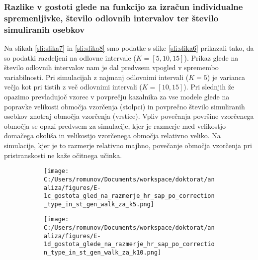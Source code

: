 \subsubsection[\bfseries Razlike v gostoti glede na funkcijo za izračun individualne spremenljivke, število odlovnih intervalov ter število simuliranih osebkov]{Razlike v gostoti glede na funkcijo za izračun individualne spremenljivke, število odlovnih intervalov ter število simuliranih osebkov}
Na slikah \ref{sli:slika7} in \ref{sli:slika8} smo podatke s slike \ref{sli:slika6} prikazali tako, da so podatki razdeljeni na odlovne intervale ($K = [5, 10, 15]$). Prikaz glede na število odlovnih intervalov nam je dal predvsem vpogled v spremembo variabilnosti. Pri simulacijah z najmanj odlovnimi intervali ($K = 5$) je varianca večja kot pri tistih z več odlovnimi intervali ($K = [10, 15]$). Pri slednjih že opazimo prevladujoč vzorec v povprečju kazalnika za vse modele glede na popravke velikosti območja vzorčenja (stolpci) in povprečno število simuliranih osebkov znotraj območja vzorčenja (vrstice). Vpliv povečanja površine vzorčenega območja se opazi predvsem za simulacije, kjer je razmerje med velikostjo domačega okoliša in velikostjo vzorčenega območja relativno veliko. Na simulacije, kjer je to razmerje relativno majhno, povečanje območja vzorčenja pri pristranskosti ne kaže očitnega učinka.

\begin{figure}[H]
  \centering
  \begin{subfigure}[b]{1\textwidth}
    \centering
    \texttt{[image: C:/Users/romunov/Documents/workspace/doktorat/analiza/figures/E-1c\_gostota\_gled\_na\_razmerje\_hr\_sap\_po\_correction\_type\_in\_st\_gen\_walk\_za\_k5.png]}
    \label{sli:sub8.1}
  \end{subfigure}

  \begin{subfigure}[b]{1\textwidth}
    \centering
    \texttt{[image: C:/Users/romunov/Documents/workspace/doktorat/analiza/figures/E-1d\_gostota\_glede\_na\_razmerje\_hr\_sap\_po\_correction\_type\_in\_st\_gen\_walk\_za\_k10.png]}
    \label{sli:sub8.2}
  \end{subfigure}
\end{figure}

